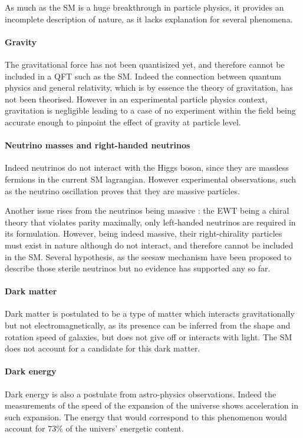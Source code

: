 As much as the SM is a huge breakthrough in particle physics, it provides an incomplete description of nature, as it lacks explanation for several phenomena. 

\paragraph{Gravity} The gravitational force has not been quantisized yet, and therefore cannot be included in a QFT such as the SM. Indeed the connection between quantum physics and general relativity, which is by essence the theory of gravitation, has not been theorised. However in an experimental particle physics  context, gravitation is negligible leading to a case of no experiment within the field being accurate enough to pinpoint the effect of gravity at particle level.

\paragraph{Neutrino masses and right-handed neutrinos} Indeed neutrinos do not interact with the Higgs boson, since they are massless fermions in the current SM lagrangian. However experimental observations, such as the neutrino oscillation \cite{PhysRevLett.81.1562,PhysRevLett.89.011301} proves that they are massive particles.

Another issue rises from the neutrinos being massive : the EWT being a chiral theory that violates parity maximally, only left-handed neutrinos are required in its formulation. However, being indeed massive, their right-chirality particles must exist in nature although do not interact, and therefore cannot be included in the SM. Several hypothesis, as the seesaw mechanism \cite{PhysRevD.22.2227,PhysRevLett.60.1813,PhysRevD.23.165,PhysRevLett.44.912,GellMann:1980vs,MINKOWSKI1977421} have been proposed to describe those sterile neutrinos but no evidence has supported any so far.

\paragraph{Dark matter} Dark matter is postulated to be a type of matter which interacts gravitationally but not electromagnetically, as its presence can be inferred from the shape and rotation speed of galaxies, but does not give off or interacts with light. The SM does not account for a candidate for this dark matter.

\paragraph{Dark energy} Dark energy is also a postulate from astro-physics observations. Indeed the measurements of the speed of the expansion of the universe shows acceleration in such expansion. The energy that would correspond to this phenomenon would account for $73\%$ of the univers' energetic content. 

